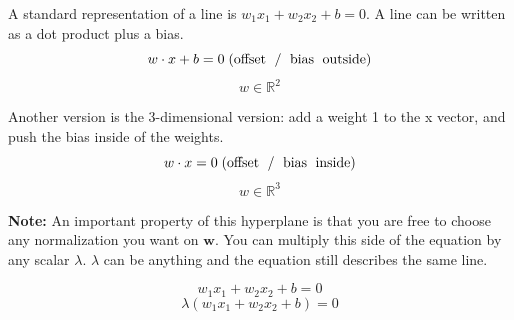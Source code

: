 \documentclass[11pt]{article}
\def\RR{\mathbb{R}}
\begin{document}
A standard representation of a line is $w_1 x_1 + w_2 x_2 + b = 0$. A line can be written as a dot product plus a bias.
$$w \cdot x + b = 0 \; \text{(offset\; / \;bias\; outside)}$$
$$w \in \RR^2 $$

Another version is the 3-dimensional version: add a weight 1 to the x vector, and push the bias inside of the weights.
$$w \cdot x  = 0 \;\text{(offset\; / \;bias\; inside)}$$
$$w \in \RR^3 $$

\textbf{Note:} An important property of this hyperplane is that you are free to choose any normalization you want on $\mathbf{w}$. You can multiply this side of the equation by any scalar $\lambda$. $\lambda$ can be anything and the equation still describes the same line.
 
$$w_1 x_1 + w_2 x_2 + b = 0$$
$$\lambda(w_1 x_1 + w_2 x_2 + b )= 0$$
\end{document}
